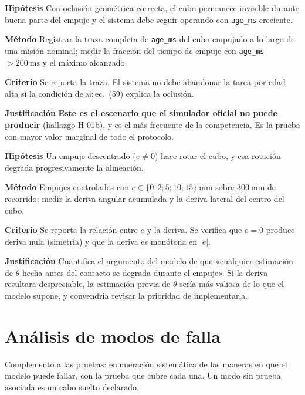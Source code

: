 \documentclass[11pt,a4paper]{article}
\newenvironment{prueba}[2]{%
  \par\medskip\noindent
  \begin{tcolorbox}[enhanced,breakable,colback=white,colframe=black!45,
    boxrule=0.5pt,arc=1pt,left=6pt,right=6pt,top=4pt,bottom=4pt,
    title={\bfseries #1\quad\normalfont #2},
    colbacktitle=black!8,coltitle=black,fonttitle=\bfseries\small]
  \small
}{\end{tcolorbox}\par\medskip}
\newcommand{\campo}[1]{\par\smallskip\noindent\textbf{#1}\quad\ignorespaces}
\begin{document}
\begin{prueba}{N4.6}{Oclusión prolongada durante el transporte}
\campo{Hipótesis} Con oclusión geométrica correcta, el cubo permanece invisible durante
buena parte del empuje y el sistema debe seguir operando con \texttt{age\_ms} creciente.
\campo{Método} Registrar la traza completa de \texttt{age\_ms} del cubo empujado a lo
largo de una misión nominal; medir la fracción del tiempo de empuje con
\texttt{age\_ms} $>200\ \mathrm{ms}$ y el máximo alcanzado.
\campo{Criterio} Se reporta la traza. El sistema no debe abandonar la tarea por edad
alta si la condición de \textsc{m}:\,ec.~(59) explica la oclusión.
\campo{Justificación} \textbf{Este es el escenario que el simulador oficial no puede
producir} (hallazgo H-01b), y es el más frecuente de la competencia. Es la prueba con
mayor valor marginal de todo el protocolo.
\end{prueba}

\begin{prueba}{N4.7}{Rotación del cubo inducida por el empuje}
\campo{Hipótesis} Un empuje descentrado ($e\ne0$) hace rotar el cubo, y esa rotación
degrada progresivamente la alineación.
\campo{Método} Empujes controlados con $e \in \{0; 2; 5; 10; 15\}\ \mathrm{mm}$ sobre
$300\ \mathrm{mm}$ de recorrido; medir la deriva angular acumulada y la deriva lateral
del centro del cubo.
\campo{Criterio} Se reporta la relación entre $e$ y la deriva. Se verifica que $e=0$
produce deriva nula (simetría) y que la deriva es monótona en $|e|$.
\campo{Justificación} Cuantifica el argumento del modelo de que «cualquier estimación de
$\theta$ hecha antes del contacto se degrada durante el empuje». Si la deriva resultara
despreciable, la estimación previa de $\theta$ sería más valiosa de lo que el modelo
supone, y convendría revisar la prioridad de implementarla.
\end{prueba}

\section{Análisis de modos de falla}

Complemento a las pruebas: enumeración sistemática de las maneras en que el modelo
puede fallar, con la prueba que cubre cada una. Un modo sin prueba asociada es un cabo
suelto declarado.
\end{document}
